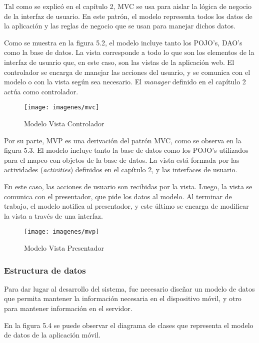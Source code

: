 Tal como se explicó en el capítulo 2, MVC se usa para aislar la lógica de negocio de la interfaz de usuario. En este patrón, el modelo representa todos los datos de la aplicación y las reglas de negocio que se usan para manejar dichos datos. 

Como se muestra en la figura 5.2, el modelo incluye tanto los POJO's, DAO's como la base de datos. La vista corresponde a todo lo que son los elementos de la interfaz de usuario que, en este caso, son las vistas de la aplicación web. El controlador se encarga de manejar las acciones del usuario, y se comunica con el modelo o con la vista según sea necesario. El \textit{manager} definido en el capítulo 2 actúa como controlador.

\begin{figure}[ht]
  \centering
  \texttt{[image: imagenes/mvc]}
  \caption{Modelo Vista Controlador}
  \label{fig:mvc}
\end{figure}

Por su parte, MVP es una derivación del patrón MVC, como se observa en la figura 5.3. El modelo incluye tanto la base de datos como los POJO's utilizados para el mapeo con objetos de la base de datos. La vista está formada por las actividades (\textit{activities}) definidos en el capítulo 2, y las interfaces de usuario.
 
En este caso, las acciones de usuario son recibidas por la vista. Luego, la vista se comunica con el presentador, que pide los datos al modelo. Al terminar de trabajo, el modelo notifica al presentador, y este último se encarga de modificar la vista a través de una interfaz.

\begin{figure}[ht]
  \centering
  \texttt{[image: imagenes/mvp]}
  \caption{Modelo Vista Presentador}
  \label{fig:mvp}
\end{figure}

\subsubsection{Estructura de datos}

Para dar lugar al desarrollo del sistema, fue necesario diseñar un modelo de datos que permita mantener la información necesaria en el dispositivo móvil, y otro para mantener información en el servidor.

En la figura 5.4 se puede observar el diagrama de clases que representa el modelo de datos de la aplicación móvil. 

